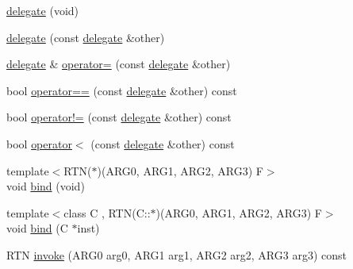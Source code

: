 \begin{DoxyCompactItemize}
\item 
\hyperlink{classcrap_1_1delegate_3_01_r_t_n_07_a_r_g0_00_01_a_r_g1_00_01_a_r_g2_00_01_a_r_g3_08_4_a69cb31c4e74db03d042296950348d319}{delegate} (void)
\item 
\hyperlink{classcrap_1_1delegate_3_01_r_t_n_07_a_r_g0_00_01_a_r_g1_00_01_a_r_g2_00_01_a_r_g3_08_4_a72af3d714928fdeb7207b2cd132a62ee}{delegate} (const \hyperlink{classcrap_1_1delegate}{delegate} \&other)
\item 
\hyperlink{classcrap_1_1delegate}{delegate} \& \hyperlink{classcrap_1_1delegate_3_01_r_t_n_07_a_r_g0_00_01_a_r_g1_00_01_a_r_g2_00_01_a_r_g3_08_4_a7985af15f5902e9a07ad942c05c94f8a}{operator=} (const \hyperlink{classcrap_1_1delegate}{delegate} \&other)
\item 
bool \hyperlink{classcrap_1_1delegate_3_01_r_t_n_07_a_r_g0_00_01_a_r_g1_00_01_a_r_g2_00_01_a_r_g3_08_4_a78aa06306591481773cb29e7ead2a742}{operator==} (const \hyperlink{classcrap_1_1delegate}{delegate} \&other) const 
\item 
bool \hyperlink{classcrap_1_1delegate_3_01_r_t_n_07_a_r_g0_00_01_a_r_g1_00_01_a_r_g2_00_01_a_r_g3_08_4_a9e8124dca8817b9c059608003d4c59a1}{operator!=} (const \hyperlink{classcrap_1_1delegate}{delegate} \&other) const 
\item 
bool \hyperlink{classcrap_1_1delegate_3_01_r_t_n_07_a_r_g0_00_01_a_r_g1_00_01_a_r_g2_00_01_a_r_g3_08_4_a443e7a8c79fca291608adf83de47fbc9}{operator$<$} (const \hyperlink{classcrap_1_1delegate}{delegate} \&other) const 
\item 
{\footnotesize template$<$R\+T\+N($\ast$)(\+A\+R\+G0, A\+R\+G1, A\+R\+G2, A\+R\+G3) F$>$ }\\void \hyperlink{classcrap_1_1delegate_3_01_r_t_n_07_a_r_g0_00_01_a_r_g1_00_01_a_r_g2_00_01_a_r_g3_08_4_a5fbc70da885cd9931f0e30ed9e3a3ff8}{bind} (void)
\item 
{\footnotesize template$<$class C , R\+T\+N(\+C\+::$\ast$)(\+A\+R\+G0, A\+R\+G1, A\+R\+G2, A\+R\+G3) F$>$ }\\void \hyperlink{classcrap_1_1delegate_3_01_r_t_n_07_a_r_g0_00_01_a_r_g1_00_01_a_r_g2_00_01_a_r_g3_08_4_a11e07c417d3b08651f9826ea9135bdc0}{bind} (C $\ast$inst)
\item 
R\+T\+N \hyperlink{classcrap_1_1delegate_3_01_r_t_n_07_a_r_g0_00_01_a_r_g1_00_01_a_r_g2_00_01_a_r_g3_08_4_aa48fe70ba4dfb3161de0dbc27092125f}{invoke} (A\+R\+G0 arg0, A\+R\+G1 arg1, A\+R\+G2 arg2, A\+R\+G3 arg3) const 
\end{DoxyCompactItemize}


